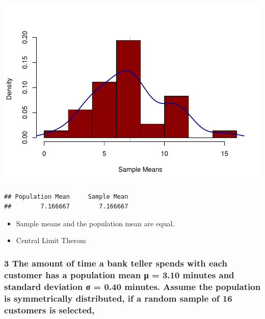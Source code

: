 \documentclass[]{article}
\newenvironment{Shaded}{\begin{snugshade}}{\end{snugshade}}
\newcommand{\KeywordTok}[1]{\textcolor[rgb]{0.13,0.29,0.53}{\textbf{#1}}}
\newcommand{\StringTok}[1]{\textcolor[rgb]{0.31,0.60,0.02}{#1}}
\newcommand{\OperatorTok}[1]{\textcolor[rgb]{0.81,0.36,0.00}{\textbf{#1}}}
\newcommand{\NormalTok}[1]{#1}
\providecommand{\tightlist}{%
  \setlength{\itemsep}{0pt}\setlength{\parskip}{0pt}}
\begin{document}
\includegraphics{Assignment_3_files/figure-latex/unnamed-chunk-2-1.pdf}

\begin{Shaded}
\end{Shaded}

\begin{verbatim}
## Population Mean     Sample Mean 
##        7.166667        7.166667
\end{verbatim}

\begin{itemize}
\tightlist
\item
  Sample means and the population mean are equal.
\item
  Central Limit Therom 
\end{itemize}

\subsubsection{3 The amount of time a bank teller spends with each
customer has a population mean μ = 3.10 minutes and standard deviation σ
= 0.40 minutes. Assume the population is symmetrically distributed, if a
random sample of 16 customers is
selected,}\label{the-amount-of-time-a-bank-teller-spends-with-each-customer-has-a-population-mean--3.10-minutes-and-standard-deviation--0.40-minutes.-assume-the-population-is-symmetrically-distributed-if-a-random-sample-of-16-customers-is-selected}
\end{document}
